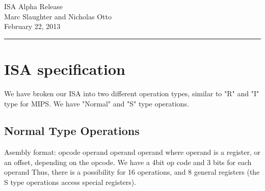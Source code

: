 \documentclass{article}
\begin{document}
\begin{center}
ISA Alpha Release\\
Marc Slaughter and Nicholas Otto\\
February 22, 2013\\
\vspace{1.5em}
\hrule
\end{center}

\section{ISA specification}
We have broken our ISA into two different operation types, similar to "R" and "I" type for MIPS.  We have "Normal" and "S" type operations.\\

\subsection{Normal Type Operations}

Asembly format: opcode operand operand operand
where operand is a register, or an offset, depending on the opcode.
We have a 4bit op code and 3 bits for each operand
Thus, there is a possibility for 16 operations, and 8 general registers (the S type operations access special registers).
\end{document}

